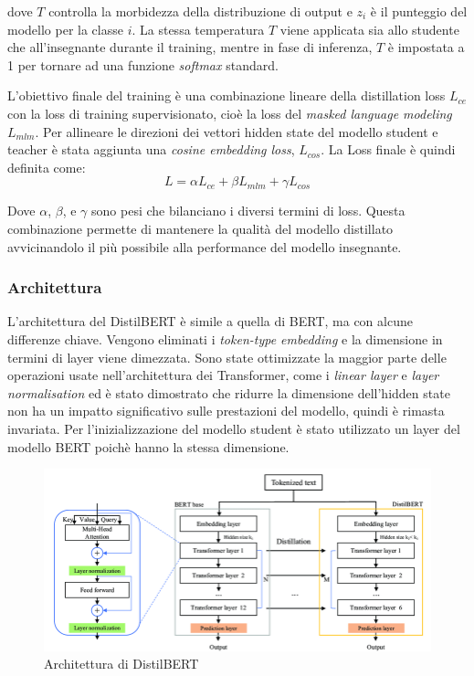 \documentclass[../../Thesis.tex]{subfiles}
\begin{document}
dove $T$ controlla la morbidezza della distribuzione di output e $z_i$ è il punteggio del modello per la classe $i$. La stessa temperatura $T$ viene applicata sia allo studente che all'insegnante durante il training, mentre in fase di inferenza, $T$ è impostata a 1 per tornare ad una funzione \textit{softmax} standard.

L'obiettivo finale del training è una combinazione lineare della distillation loss $L_{ce}$ con la loss di  training supervisionato, cioè la loss del \textit{masked language modeling} $L_{mlm}$. Per allineare le direzioni dei vettori hidden state del modello student e teacher è stata aggiunta una  \textit{cosine embedding loss}, $L_{cos}$. La Loss finale è quindi definita come:
$$
L = \alpha L_{ce} + \beta L_{mlm} + \gamma L_{cos}
$$

Dove $\alpha$, $\beta$, e $\gamma$ sono pesi che bilanciano i diversi termini di loss. Questa combinazione permette di mantenere la qualità del modello distillato avvicinandolo il più possibile alla performance del modello insegnante.

\subsubsection{Architettura}
L'architettura del DistilBERT è simile a quella di BERT, ma con alcune differenze chiave. Vengono eliminati i \emph{token-type embedding} e la dimensione in termini di layer viene dimezzata. Sono state ottimizzate la maggior parte delle operazioni usate nell'architettura dei Transformer, come i \emph{linear layer} e \emph{layer normalisation} ed è stato dimostrato che ridurre la dimensione dell'hidden state non ha un impatto significativo sulle prestazioni del modello, quindi è rimasta invariata. Per l'inizializzazione del modello student è stato utilizzato un layer del modello BERT poichè hanno la stessa dimensione. 

\begin{figure}
    \centering
    \includegraphics[width=\textwidth]{../../img/DistilBERT-Architecture.png}
    \caption{Architettura di DistilBERT}
    \label{fig:distilbert}
\end{figure}
\end{document}
